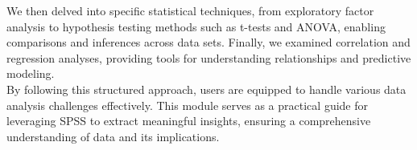 \documentclass[
  letterpaper,
  DIV=11,
  numbers=noendperiod]{scrreprt}
\begin{document}
We then delved into specific statistical techniques, from exploratory
factor analysis to hypothesis testing methods such as t-tests and ANOVA,
enabling comparisons and inferences across data sets. Finally, we
examined correlation and regression analyses, providing tools for
understanding relationships and predictive modeling.\\

By following this structured approach, users are equipped to handle
various data analysis challenges effectively. This module serves as a
practical guide for leveraging SPSS to extract meaningful insights,
ensuring a comprehensive understanding of data and its implications.\\
\end{document}
